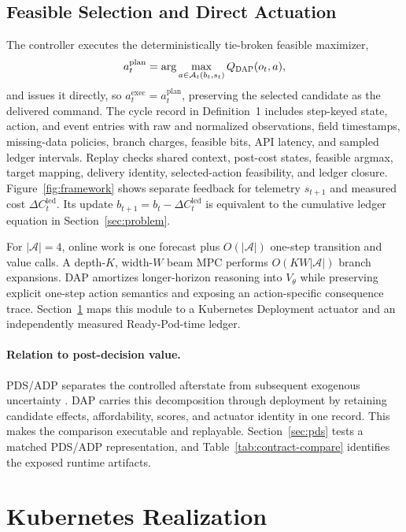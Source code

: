 \documentclass[acmsmall,screen,review,anonymous]{acmart}
\newcommand{\method}{\textsc{DAP}\xspace}
\begin{document}
\subsection{Feasible Selection and Direct Actuation}

The controller executes the deterministically tie-broken feasible maximizer,
\begin{equation}
  a_t^{\mathrm{plan}}=
  \arg\max_{a\in\mathcal A_t(b_t,s_t)}Q_{\method}(o_t,a),
\end{equation}
and issues it directly, so \(a_t^{\mathrm{exec}}=a_t^{\mathrm{plan}}\),
preserving the selected candidate as the delivered command. The cycle record
in Definition~1 includes step-keyed state, action, and event entries with raw
and normalized observations, field timestamps, missing-data policies, branch
charges, feasible bits, API latency, and sampled ledger intervals. Replay
checks shared context, post-cost states, feasible argmax, target mapping,
delivery identity, selected-action feasibility, and ledger closure.
Figure~\ref{fig:framework} shows separate feedback for telemetry \(s_{t+1}\)
and measured cost \(\Delta C_t^{\mathrm{led}}\). Its update
\(b_{t+1}=b_t-\Delta C_t^{\mathrm{led}}\) is equivalent to the cumulative
ledger equation in Section~\ref{sec:problem}.

For \(|\mathcal A|=4\), online work is one forecast plus
\(O(|\mathcal A|)\) one-step transition and value calls.  A depth-\(K\),
width-\(W\) beam MPC performs \(O(KW|\mathcal A|)\) branch expansions.  \method
amortizes longer-horizon reasoning into \(V_\theta\) while preserving explicit
one-step action semantics and exposing an action-specific consequence trace.
Section~\ref{sec:k8s} maps
this module to a Kubernetes Deployment actuator and an independently measured
Ready-Pod-time ledger.

\paragraph{Relation to post-decision value.}
PDS/ADP separates the controlled afterstate from subsequent exogenous
uncertainty \cite{jiang2015monotoneadp,bhat2026pds}. DAP carries this
decomposition through deployment by retaining candidate effects, affordability,
scores, and actuator identity in one record. This makes the comparison
executable and replayable. Section~\ref{sec:pds} tests a matched PDS/ADP
representation, and Table~\ref{tab:contract-compare} identifies the exposed
runtime artifacts.

\section{Kubernetes Realization}
\label{sec:k8s}
\end{document}
